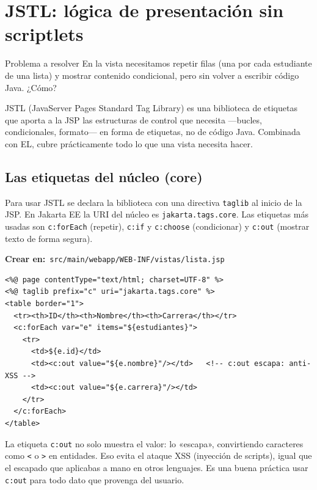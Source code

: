 \documentclass[11pt]{article}
\begin{document}
\section{JSTL: lógica de presentación sin scriptlets}
\begin{cajaproblema}{Problema a resolver}
En la vista necesitamos repetir filas (una por cada estudiante de una lista) y mostrar contenido condicional, pero sin volver a escribir código Java. ¿Cómo?\par
\end{cajaproblema}
JSTL (JavaServer Pages Standard Tag Library) es una biblioteca de etiquetas que aporta a la JSP las estructuras de control que necesita —bucles, condicionales, formato— en forma de etiquetas, no de código Java. Combinada con EL, cubre prácticamente todo lo que una vista necesita hacer.

\subsection{Las etiquetas del núcleo (core)}
Para usar JSTL se declara la biblioteca con una directiva \texttt{taglib} al inicio de la JSP. En Jakarta EE la URI del núcleo es \texttt{jakarta.\allowbreak{}tags.\allowbreak{}core}. Las etiquetas más usadas son \texttt{c:\allowbreak{}for\allowbreak{}Each} (repetir), \texttt{c:\allowbreak{}if} y \texttt{c:\allowbreak{}choose} (condicionar) y \texttt{c:\allowbreak{}out} (mostrar texto de forma segura).

{\small\color{jwebazulo}\textbf{Crear en:}~}\texttt{src/\allowbreak{}main/\allowbreak{}webapp/\allowbreak{}WEB-INF/\allowbreak{}vistas/\allowbreak{}lista.\allowbreak{}jsp}\par\nobreak\vspace{-1pt}
\begin{cajacodigo}
\begin{lstlisting}[style=markup]
<%@ page contentType="text/html; charset=UTF-8" %>
<%@ taglib prefix="c" uri="jakarta.tags.core" %>
<table border="1">
  <tr><th>ID</th><th>Nombre</th><th>Carrera</th></tr>
  <c:forEach var="e" items="${estudiantes}">
    <tr>
      <td>${e.id}</td>
      <td><c:out value="${e.nombre}"/></td>   <!-- c:out escapa: anti-XSS -->
      <td><c:out value="${e.carrera}"/></td>
    </tr>
  </c:forEach>
</table>
\end{lstlisting}
\end{cajacodigo}
\vspace{2pt}
La etiqueta \texttt{c:\allowbreak{}out} no solo muestra el valor: lo «escapa», convirtiendo caracteres como \texttt{\textless{}} o \texttt{\textgreater{}} en entidades. Eso evita el ataque XSS (inyección de scripts), igual que el escapado que aplicabas a mano en otros lenguajes. Es una buena práctica usar \texttt{c:\allowbreak{}out} para todo dato que provenga del usuario.
\end{document}
